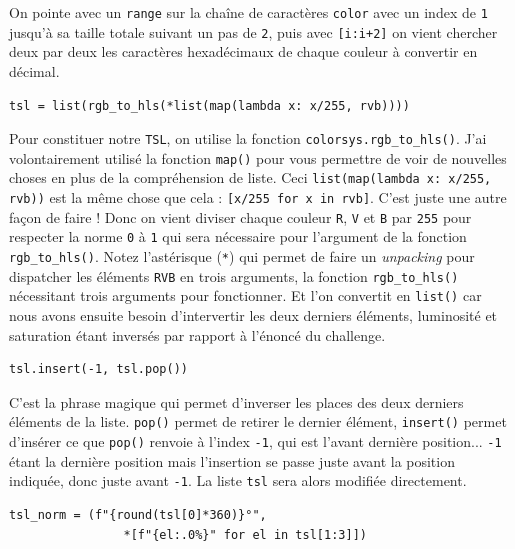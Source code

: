 On pointe avec un \texttt{range} sur la chaîne de caractères \texttt{color} avec un index de \texttt{1} jusqu'à sa taille totale suivant un pas de \texttt{2}, puis avec \texttt{[i:i+2]} on vient chercher deux par deux les caractères hexadécimaux de chaque couleur à convertir en décimal.
\medskip

\begin{lstlisting}
tsl = list(rgb_to_hls(*list(map(lambda x: x/255, rvb))))
\end{lstlisting}
\medskip

Pour constituer notre \texttt{TSL}, on utilise la fonction \texttt{colorsys.rgb\_to\_hls()}. J'ai volontairement utilisé la fonction \texttt{map()} pour vous permettre de voir de nouvelles choses en plus de la compréhension de liste. Ceci \texttt{list(map(lambda x: x/255, rvb))} est la même chose que cela : \texttt{[x/255 for x in rvb]}. C'est juste une autre façon de faire ! Donc on vient diviser chaque couleur \texttt{R}, \texttt{V} et \texttt{B} par \texttt{255} pour respecter la norme \texttt{0} à \texttt{1} qui sera nécessaire pour l'argument de la fonction \texttt{rgb\_to\_hls()}. Notez l'astérisque (\texttt{*}) qui permet de faire un \textit{unpacking} pour dispatcher les éléments \texttt{RVB} en trois arguments, la fonction \texttt{rgb\_to\_hls()} nécessitant trois arguments pour fonctionner. Et l'on convertit en \texttt{list()} car nous avons ensuite besoin d'intervertir les deux derniers éléments, luminosité et saturation étant inversés par rapport à l'énoncé du challenge.
\medskip

\begin{lstlisting}
tsl.insert(-1, tsl.pop())
\end{lstlisting}
\medskip

C'est la phrase magique qui permet d'inverser les places des deux derniers éléments de la liste. \texttt{pop()} permet de retirer le dernier élément, 
\texttt{insert()} permet d'insérer ce que \texttt{pop()} renvoie à l'index \texttt{-1}, qui est l'avant dernière position... \texttt{-1} étant la dernière position mais l'insertion se passe juste avant la position indiquée, donc juste avant \texttt{-1}. La liste \texttt{tsl} sera alors modifiée directement.
\medskip

\begin{lstlisting}
tsl_norm = (f"{round(tsl[0]*360)}°",
                *[f"{el:.0%}" for el in tsl[1:3]])
\end{lstlisting}
\medskip

